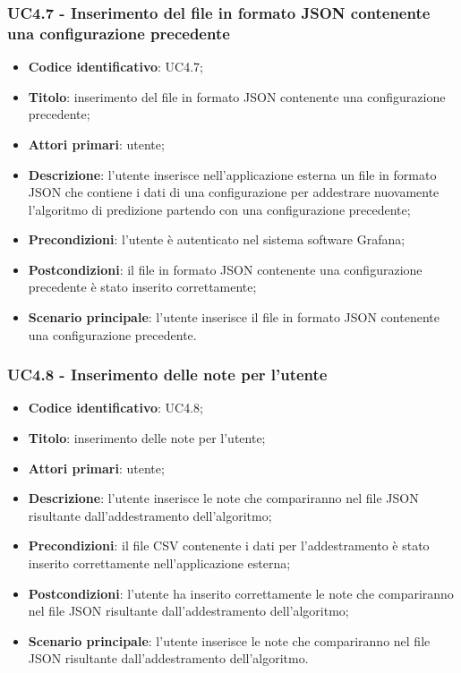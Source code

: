 \subsubsection{UC4.7 - Inserimento del file in formato JSON contenente una configurazione precedente}
\begin{itemize}
	\item \textbf{Codice identificativo}: UC4.7;
	\item \textbf{Titolo}: inserimento del file in formato JSON contenente una configurazione precedente;
	\item \textbf{Attori primari}: utente;
	\item \textbf{Descrizione}: l'utente inserisce nell'applicazione esterna un file in formato JSON che contiene i dati di una configurazione per addestrare nuovamente l'algoritmo di predizione partendo con una configurazione precedente;
	\item \textbf{Precondizioni}: l'utente è autenticato nel sistema software Grafana\glo;
	\item \textbf{Postcondizioni}: il file in formato JSON contenente una configurazione precedente è stato inserito correttamente;
	\item \textbf{Scenario principale}: l'utente inserisce il file in formato JSON contenente una configurazione precedente.
\end{itemize}
\subsubsection{UC4.8 - Inserimento delle note per l'utente}
\begin{itemize}
	\item \textbf{Codice identificativo}: UC4.8;
	\item \textbf{Titolo}: inserimento delle note per l'utente;
	\item \textbf{Attori primari}: utente;
	\item \textbf{Descrizione}: l'utente inserisce le note che compariranno nel file JSON risultante dall'addestramento dell'algoritmo;
	\item \textbf{Precondizioni}: il file CSV contenente i dati per l'addestramento è stato inserito correttamente nell'applicazione esterna;
	\item \textbf{Postcondizioni}: l'utente ha inserito correttamente le note che compariranno nel file JSON risultante dall'addestramento dell'algoritmo;
	\item \textbf{Scenario principale}: l'utente inserisce le note che compariranno nel file JSON risultante dall'addestramento dell'algoritmo.
\end{itemize}
